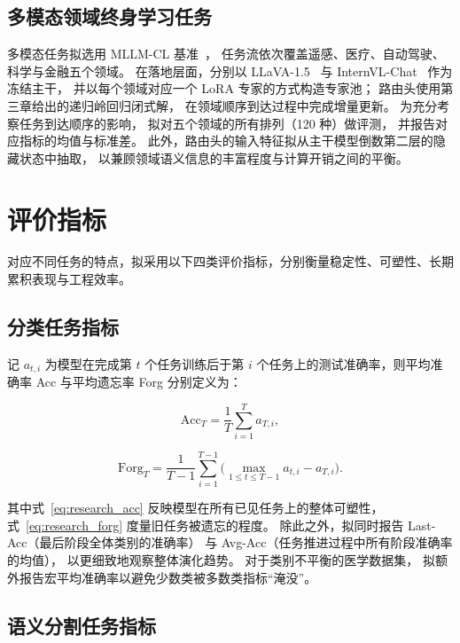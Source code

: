 \subsection{多模态领域终身学习任务}

多模态任务拟选用 MLLM-CL 基准~\citep{zhao2025mllm}，
任务流依次覆盖遥感、医疗、自动驾驶、科学与金融五个领域。
在落地层面，分别以 LLaVA-1.5~\citep{liu2023llava}
与 InternVL-Chat~\citep{chen2024internvl} 作为冻结主干，
并以每个领域对应一个 LoRA 专家的方式构造专家池；
路由头使用第三章给出的递归岭回归闭式解，
在领域顺序到达过程中完成增量更新。
为充分考察任务到达顺序的影响，
拟对五个领域的所有排列（120 种）做评测，
并报告对应指标的均值与标准差。
此外，路由头的输入特征拟从主干模型倒数第二层的隐藏状态中抽取，
以兼顾领域语义信息的丰富程度与计算开销之间的平衡。

\section{评价指标}

对应不同任务的特点，拟采用以下四类评价指标，分别衡量稳定性、可塑性、长期累积表现与工程效率。

\subsection{分类任务指标}

记 $a_{t,i}$ 为模型在完成第 $t$ 个任务训练后于第 $i$ 个任务上的测试准确率，则平均准确率 Acc 与平均遗忘率 Forg 分别定义为：

\begin{equation}
\label{eq:research_acc}
\mathrm{Acc}_T = \frac{1}{T}\sum_{i=1}^{T} a_{T,i},
\end{equation}

\begin{equation}
\label{eq:research_forg}
\mathrm{Forg}_T = \frac{1}{T-1}\sum_{i=1}^{T-1}\bigl(\max_{1\le t\le T-1} a_{t,i} - a_{T,i}\bigr).
\end{equation}

其中式~\eqref{eq:research_acc} 反映模型在所有已见任务上的整体可塑性，
式~\eqref{eq:research_forg} 度量旧任务被遗忘的程度。
除此之外，拟同时报告 Last-Acc（最后阶段全体类别的准确率）
与 Avg-Acc（任务推进过程中所有阶段准确率的均值），
以更细致地观察整体演化趋势。
对于类别不平衡的医学数据集，
拟额外报告宏平均准确率以避免少数类被多数类指标“淹没”。

\subsection{语义分割任务指标}

